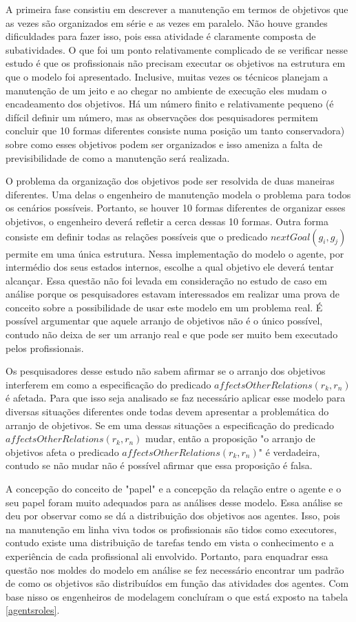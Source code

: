 A primeira fase consistiu em descrever a manutenção em termos de objetivos que as vezes são organizados em série e as vezes em paralelo. Não houve grandes dificuldades para fazer isso, pois essa atividade é claramente composta de subatividades. O que foi um ponto relativamente complicado de se verificar nesse estudo é que os profissionais não precisam executar os objetivos na estrutura em que o modelo foi apresentado. Inclusive, muitas vezes os técnicos planejam a manutenção de um jeito e ao chegar no ambiente de execução eles mudam o encadeamento dos objetivos. Há um número finito e relativamente pequeno (é difícil definir um número, mas as observações dos pesquisadores permitem concluir que 10 formas diferentes consiste numa posição um tanto conservadora) sobre como esses objetivos podem ser organizados e isso ameniza a falta de previsibilidade de como a manutenção será realizada. 

O problema da organização dos objetivos pode ser resolvida de duas maneiras diferentes. Uma delas o engenheiro de manutenção modela o problema para todos os cenários possíveis. Portanto, se houver 10 formas diferentes de organizar esses objetivos, o engenheiro deverá refletir a cerca dessas 10 formas. Outra forma consiste em definir todas as relações possíveis que o predicado $nextGoal(g_i,g_j)$ permite em uma única estrutura. Nessa implementação do modelo o agente, por intermédio dos seus estados internos, escolhe a qual objetivo ele deverá tentar alcançar. Essa questão não foi levada em consideração no estudo de caso em análise porque os pesquisadores estavam interessados em realizar uma prova de conceito sobre a possibilidade de usar este modelo em um problema real. É possível argumentar que aquele arranjo de objetivos não é o único possível, contudo não deixa de ser um arranjo real e que pode ser muito bem executado pelos profissionais. 

Os pesquisadores desse estudo não sabem afirmar se o arranjo dos objetivos interferem em como a especificação do predicado $affectsOtherRelations(r_k,r_n)$ é afetada. Para que isso seja analisado se faz necessário aplicar esse modelo para diversas situações diferentes onde todas devem apresentar a problemática do arranjo de objetivos. Se em uma dessas situações a especificação do predicado $affectsOtherRelations(r_k,r_n)$ mudar, então a proposição "o arranjo de objetivos afeta o predicado $affectsOtherRelations(r_k,r_n)$" é verdadeira, contudo se não mudar não é possível afirmar que essa proposição é falsa. 

A concepção do conceito de "papel" e a concepção da relação entre o agente e o seu papel foram muito adequados para as análises desse modelo. Essa análise se deu por observar como se dá  a distribuição dos objetivos aos agentes. Isso, pois na manutenção em linha viva todos os profissionais são tidos como executores, contudo existe uma distribuição de tarefas tendo em vista o conhecimento e a experiência de cada profissional ali envolvido. Portanto, para enquadrar essa questão nos moldes do modelo em análise se fez necessário encontrar um padrão de como os objetivos são distribuídos em função das atividades dos agentes. Com base nisso os engenheiros de modelagem concluíram o que está exposto na tabela \ref{agentsroles}.

